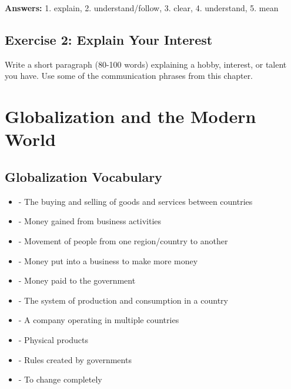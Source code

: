 \textbf{Answers:} 1. explain, 2. understand/follow, 3. clear, 4. understand, 5. mean

\subsection{Exercise 2: Explain Your Interest}
Write a short paragraph (80-100 words) explaining a hobby, interest, or talent you have. Use some of the communication phrases from this chapter.

\begin{tcolorbox}[colback=white,height=6cm]
\end{tcolorbox}

\section{Globalization and the Modern World}

\subsection{Globalization Vocabulary}

\begin{vocabbox}[title=Key Terms for Globalization]
\begin{itemize}
    \item {}  - The buying and selling of goods and services between countries
    \item {}  - Money gained from business activities
    \item {}  - Movement of people from one region/country to another
    \item {}  - Money put into a business to make more money
    \item {}  - Money paid to the government
    \item {}  - The system of production and consumption in a country
    \item {}  - A company operating in multiple countries
    \item {}  - Physical products
    \item {}  - Rules created by governments
    \item {}  - To change completely
\end{itemize}
\end{vocabbox}

